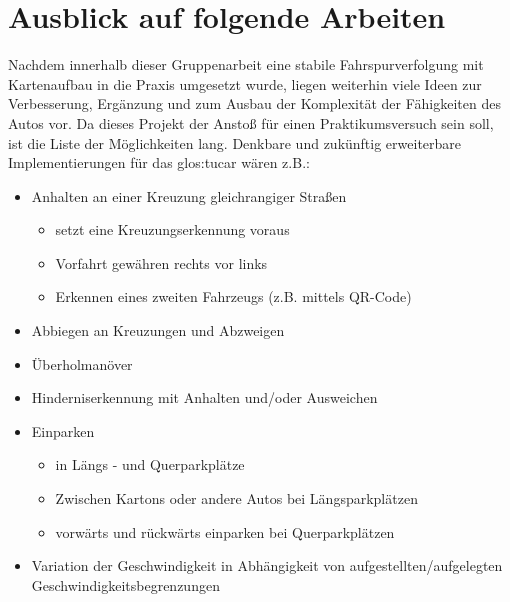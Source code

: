 \chapter{Ausblick auf folgende Arbeiten \dcfirstauthorshort}
\label{cha:ausblick}

Nachdem innerhalb dieser Gruppenarbeit eine stabile Fahrspurverfolgung mit Kartenaufbau in die Praxis umgesetzt wurde, liegen weiterhin viele Ideen zur Verbesserung, Ergänzung und zum Ausbau der Komplexität der Fähigkeiten des Autos vor. Da dieses Projekt der Anstoß für einen Praktikumsversuch sein soll, ist die Liste der Möglichkeiten lang. Denkbare und zukünftig erweiterbare Implementierungen für das \gls{glos:tucar} wären z.B.:

\begin{itemize}
\item Anhalten an einer Kreuzung gleichrangiger Straßen
	\begin{itemize}
	\item setzt eine Kreuzungserkennung voraus
	\item Vorfahrt gewähren \glqq rechts vor links\grqq
	\item Erkennen eines zweiten Fahrzeugs (z.B. mittels QR-Code)
	\end{itemize}
\item Abbiegen an Kreuzungen und Abzweigen
\item Überholmanöver
\item Hinderniserkennung mit Anhalten und/oder Ausweichen 
\item Einparken
	\begin{itemize}
	\item in Längs - und Querparkplätze
	\item Zwischen Kartons oder andere Autos bei Längsparkplätzen
	\item vorwärts und rückwärts einparken bei Querparkplätzen
	\end{itemize}
\item Variation der Geschwindigkeit in Abhängigkeit von aufgestellten/aufgelegten Geschwindigkeitsbegrenzungen
\end{itemize}
